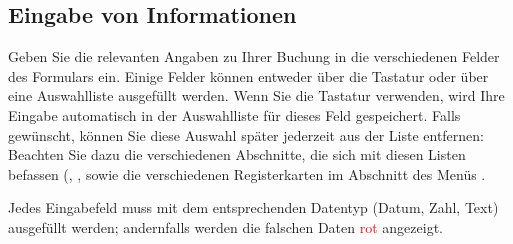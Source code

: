 \subsection{Eingabe von Informationen\label{transactions-new-entry}}

Geben Sie die relevanten Angaben zu Ihrer Buchung in die verschiedenen Felder des Formulars ein. Einige Felder können entweder über die Tastatur oder über eine Auswahlliste ausgefüllt werden. Wenn Sie die Tastatur verwenden, wird Ihre Eingabe automatisch in der Auswahlliste für dieses Feld gespeichert. Falls gewünscht, können Sie diese Auswahl später jederzeit aus der Liste entfernen: Beachten Sie dazu die verschiedenen Abschnitte, die sich mit diesen Listen befassen (, ,  sowie die verschiedenen Registerkarten im Abschnitt  des Menüs .

Jedes Eingabefeld muss mit dem entsprechenden Datentyp (Datum, Zahl, Text) ausgefüllt werden; andernfalls werden die falschen Daten \textcolor{red}{rot} angezeigt.


